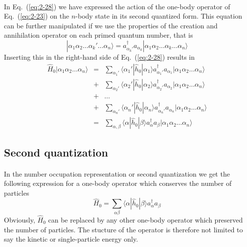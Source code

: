 \documentclass[%
twoside,                 %
final,                   %
10pt]{article}
\begin{document}
\paragraph{}
In Eq.~(\ref{eq:2-28}) 
we have expressed the action of the one-body operator
of Eq.~(\ref{eq:2-23}) on the  $n$-body state in its second quantized form.
This equation can be further manipulated if we use the properties of the creation and annihilation operator
on each primed quantum number, that is
\begin{equation}
	|\alpha_1\alpha_2 \dots \alpha_k' \dots \alpha_{n}\rangle = 
		a_{\alpha_k'}^{\dagger}  a_{\alpha_k} |\alpha_1\alpha_2 \dots \alpha_k \dots \alpha_{n}\rangle \label{eq:2-29}
\end{equation}
Inserting this in the right-hand side of Eq.~(\ref{eq:2-28}) results in
\begin{eqnarray}
	\hat{H}_0|\alpha_1\alpha_2 \dots \alpha_{n}\rangle &=& \sum_{\alpha_1'}\langle \alpha_1'|\hat{h}_0|\alpha_1\rangle
		a_{\alpha_1'}^{\dagger}  a_{\alpha_1} |\alpha_1\alpha_2 \dots \alpha_{n}\rangle \nonumber \\
	&+& \sum_{\alpha_2'} \langle \alpha_2'|\hat{h}_0|\alpha_2\rangle
		a_{\alpha_2'}^{\dagger}  a_{\alpha_2} |\alpha_1\alpha_2 \dots \alpha_{n}\rangle \nonumber \\
	&+& \dots \nonumber \\
	&+& \sum_{\alpha_n'} \langle \alpha_n'|\hat{h}_0|\alpha_n\rangle
		a_{\alpha_n'}^{\dagger}  a_{\alpha_n} |\alpha_1\alpha_2 \dots \alpha_{n}\rangle \nonumber \\
	&=& \sum_{\alpha, \beta} \langle \alpha|\hat{h}_0|\beta\rangle a_\alpha^{\dagger} a_\beta 
		|\alpha_1\alpha_2 \dots \alpha_{n}\rangle \label{eq:2-30a}
\end{eqnarray}




\subsection*{Second quantization}

\paragraph{}
In the number occupation representation or second quantization we get the following expression for a one-body 
operator which conserves the number of particles
\begin{equation}
	\hat{H}_0 = \sum_{\alpha\beta} \langle \alpha|\hat{h}_0|\beta\rangle a_\alpha^{\dagger} a_\beta \label{eq:2-30b}
\end{equation}
Obviously, $\hat{H}_0$ can be replaced by any other one-body  operator which preserved the number
of particles. The stucture of the operator is therefore not limited to say the kinetic or single-particle energy only.
\end{document}
